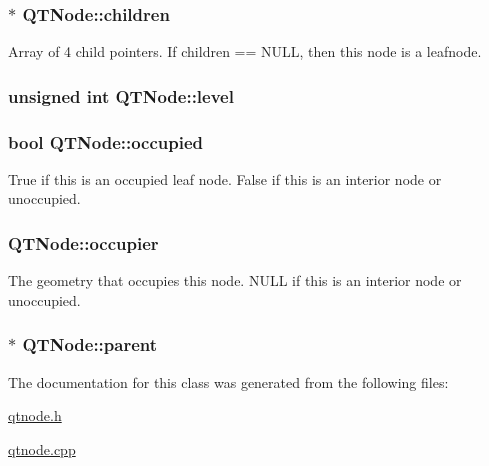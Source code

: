 \hypertarget{class_q_t_node_aacf4c1618f753633cb7ea9ddb76690f9}{
\subsubsection[{children}]{$\ast$ Q\+T\+Node\+::children}}\label{class_q_t_node_aacf4c1618f753633cb7ea9ddb76690f9}
Array of 4 child pointers. If children == N\+U\+L\+L, then this node is a leafnode. \hypertarget{class_q_t_node_a40d33fe4103a3a895137cfb08c246010}{
\subsubsection[{level}]{\setlength{\rightskip}{0pt plus 5cm}unsigned int Q\+T\+Node\+::level}}\label{class_q_t_node_a40d33fe4103a3a895137cfb08c246010}
\hypertarget{class_q_t_node_aaa8bd41ed3407ecad40f52659ecb84b8}{
\subsubsection[{occupied}]{\setlength{\rightskip}{0pt plus 5cm}bool Q\+T\+Node\+::occupied}}\label{class_q_t_node_aaa8bd41ed3407ecad40f52659ecb84b8}
True if this is an occupied leaf node. False if this is an interior node or unoccupied. \hypertarget{class_q_t_node_aa101f25c611e27299a96f510567c9516}{
\subsubsection[{occupier}]{ Q\+T\+Node\+::occupier}}\label{class_q_t_node_aa101f25c611e27299a96f510567c9516}
The geometry that occupies this node. N\+U\+L\+L if this is an interior node or unoccupied. \hypertarget{class_q_t_node_a1d8821384dae11149cb108440b108176}{
\subsubsection[{parent}]{$\ast$ Q\+T\+Node\+::parent}}\label{class_q_t_node_a1d8821384dae11149cb108440b108176}


The documentation for this class was generated from the following files\+:\begin{DoxyCompactItemize}
\item 
\hyperlink{qtnode_8h}{qtnode.\+h}\item 
\hyperlink{qtnode_8cpp}{qtnode.\+cpp}\end{DoxyCompactItemize}
